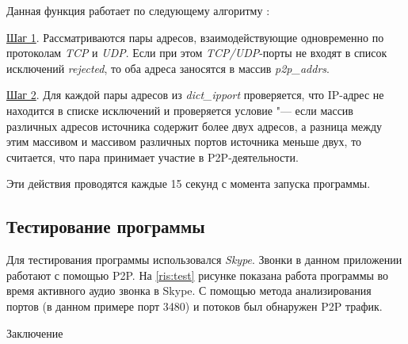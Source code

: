 \documentclass[bachelor, och, coursework]{SCWorks}
\begin{document}
Данная функция работает по следующему алгоритму \cite{algorithm}:

\underline{Шаг 1}. Рассматриваются пары адресов, взаимодействующие одновременно по протоколам \textit{TCP} и \textit{UDP}. 
Если при этом \textit{TCP/UDP}-порты не входят в список исключений \textit{rejected}, то оба адреса заносятся в массив \textit{p2p_addrs}.

\underline{Шаг 2}. Для каждой пары адресов из \textit{dict_ipport} проверяется, что IP-адрес не находится в списке исключений и проверяется
условие "--- если массив различных адресов источника содержит более двух адресов, а разница между этим массивом и массивом различных портов
источника меньше двух, то считается, что пара принимает участие в P2P-деятельности.

Эти действия проводятся каждые 15 секунд с момента запуска программы.

\subsection{Тестирование программы}
Для тестирования программы использовался \textit{Skype}. Звонки в данном приложении работают с помощью P2P. 
На \ref{ris:test} рисунке показана работа программы во время активного аудио звонка в Skype. С помощью метода анализирования 
портов (в данном примере порт 3480) и потоков был обнаружен P2P трафик.

\conclusion
Заключение



\end{document}
